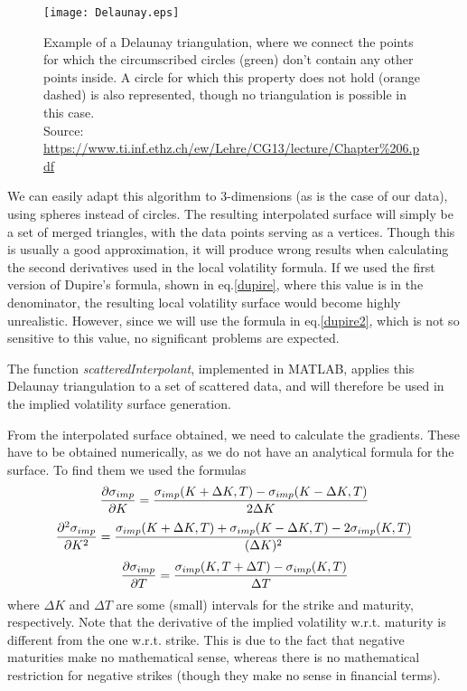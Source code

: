 \begin{figure}[!htb]
    \centering
      \texttt{[image: Delaunay.eps]}
      \caption[Example of a Delaunay triangulation, where we connect the points for which the circumscribed circles don't contain any other points inside. A circle for which this property does not hold is also represented, though no triangulation is possible in this case.]{Example of a Delaunay triangulation, where we connect the points for which the circumscribed circles (green) don't contain any other points inside. A circle for which this property does not hold (orange dashed) is also represented, though no triangulation is possible in this case.\\{\small Source: \url{https://www.ti.inf.ethz.ch/ew/Lehre/CG13/lecture/Chapter\%206.pdf}}}\label{fig:Delaunay}
    \end{figure}

 We can easily adapt this algorithm to 3-dimensions (as is the case of our data), using spheres instead of circles.
The resulting interpolated surface will simply be a set of merged triangles, with the data points serving as a vertices. Though this is usually a good approximation, it will produce wrong results when calculating the second derivatives used in the local volatility formula. If we used the first version of Dupire's formula, shown in eq.\eqref{dupire}, where this value is in the denominator, the resulting local volatility surface would become highly unrealistic. However, since we will use the formula in eq.\eqref{dupire2}, which is not so sensitive to this value, no significant problems are expected.

The function \emph{scatteredInterpolant}, implemented in MATLAB, applies this Delaunay triangulation to a set of scattered data, and will therefore be used in the implied volatility surface generation.


From the interpolated surface obtained, we need to calculate the gradients. These have to be obtained numerically, as we do not have an analytical formula for the surface. To find them we used the formulas
\begin{equation}
\pdv{\sigma_{imp}}{K}(K,T)=\frac{\sigma_{imp}(K+\Delta K,T)-\sigma_{imp}(K-\Delta K,T)}{2\Delta K}
\end{equation}
\begin{equation}
\pdv{^2\sigma_{imp}}{K^2}(K,T)=\frac{\sigma_{imp}(K+\Delta K,T)+\sigma_{imp}(K-\Delta K,T)-2\sigma_{imp}(K,T)}{(\Delta K)^2}
\end{equation}
\begin{equation}
\pdv{\sigma_{imp}}{T}(K,T)=\frac{\sigma_{imp}(K,T+\Delta T)-\sigma_{imp}(K,T)}{\Delta T}
\end{equation}
\noindent where $\Delta K$ and $\Delta T$ are some (small) intervals for the strike and maturity, respectively. Note that the derivative of the implied volatility w.r.t. maturity is different from the one w.r.t. strike. This is due to the fact that negative maturities make no mathematical sense, whereas there is no mathematical restriction for negative strikes (though they make no sense in financial terms).

